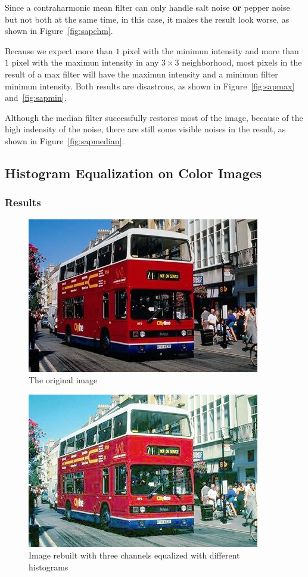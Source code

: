 \documentclass{article}
\begin{document}
Since a contraharmonic mean filter can only handle salt noise \textbf{or} pepper noise but not both at the same time, in this case, it makes the result look worse, as shown in Figure~\ref{fig:sapchm}.

Because we expect more than $1$ pixel with the minimun intensity and more than $1$ pixel with the maximun intensity in any $3 \times 3$ neighborhood, most pixels in the result of a max filter will have the maximun intensity and a minimun filter minimun intensity. Both results are disastrous, as shown in Figure~\ref{fig:sapmax} and~\ref{fig:sapmin}.

Although the median filter successfully restores most of the image, because of the high indensity of the noise, there are still some visible noises in the result, as shown in Figure~\ref{fig:sapmedian}.

\subsection{Histogram Equalization on Color Images}

\subsubsection{Results}

\begin{figure}[H]
	\centering
	\includegraphics[width=288pt]{../img/02.png}
	\caption{The original image}
\end{figure}

\begin{figure}[H]
	\centering
	\includegraphics[width=288pt]{../result/hist/hist-seperate.png}
	\caption{Image rebuilt with three channels equalized with different histograms}
	\label{fig:sep}
\end{figure}
\end{document}
